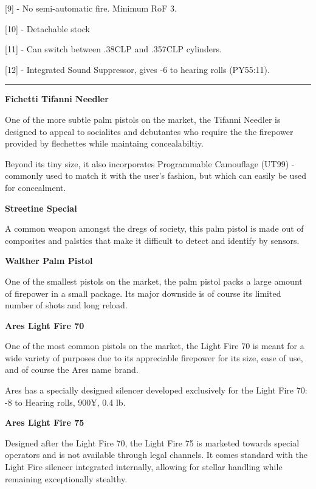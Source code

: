 [9] - No semi-automatic fire. Minimum RoF 3.

[10] - Detachable stock

[11] - Can switch between .38CLP and .357CLP cylinders.

[12] - Integrated Sound Suppressor, gives -6 to hearing rolls (PY55:11).

\par\rule{\textwidth}{0.5pt} 

\begin{mdframed}[linewidth=0pt]
	\begin{multicols}{2}
		
		\textbf{Fichetti Tifanni Needler}
		
		One of the more subtle palm pistols on the market, the Tifanni Needler is designed to appeal to socialites and debutantes who require the the firepower provided by flechettes while maintaing concealabiltiy.
		
		Beyond its tiny size, it also incorporates Programmable Camouflage (UT99) - commonly used to match it with the user's fashion, but which can easily be used for concealment.
		
		\textbf{Streetine Special}

		A common weapon amongst the dregs of society, this palm pistol is made out of composites and palstics that make it difficult to detect and identify by sensors.
		
		\textbf{Walther Palm Pistol}
		
		One of the smallest pistols on the market, the palm pistol packs a large amount of firepower in a small package. Its major downside is of course its limited number of shots and long reload.
		
		\textbf{Ares Light Fire 70}
		
		One of the most common pistols on the market, the Light Fire 70 is meant for a wide variety of purposes due to its appreciable firepower for its size, ease of use, and of course the Ares name brand.
		
		Ares has a specially designed silencer developed exclusively for the Light Fire 70: -8 to Hearing rolls, 900¥, 0.4 lb.
		
		\textbf{Ares Light Fire 75}
		
		Designed after the Light Fire 70, the Light Fire 75 is marketed towards special operators and is not available through legal channels. It comes standard with the Light Fire silencer integrated internally, allowing for stellar handling while remaining exceptionally stealthy.
		

\end{multicols}
\end{mdframed}
